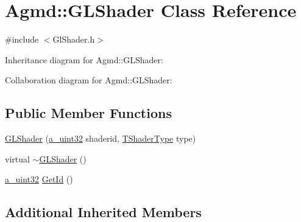 \hypertarget{class_agmd_1_1_g_l_shader}{\section{Agmd\+:\+:G\+L\+Shader Class Reference}
\label{class_agmd_1_1_g_l_shader}
}


{\ttfamily \#include $<$Gl\+Shader.\+h$>$}



Inheritance diagram for Agmd\+:\+:G\+L\+Shader\+:


Collaboration diagram for Agmd\+:\+:G\+L\+Shader\+:
\subsection*{Public Member Functions}
\begin{DoxyCompactItemize}
\item 
\hyperlink{class_agmd_1_1_g_l_shader_a40249832d8d259d55473b76db93048e6}{G\+L\+Shader} (\hyperlink{_common_defines_8h_a964296f9770051b9e4807b1f180dd416}{a\+\_\+uint32} shaderid, \hyperlink{namespace_agmd_a162a493eaff1589f07a505806e6724b4}{T\+Shader\+Type} type)
\item 
virtual \hyperlink{class_agmd_1_1_g_l_shader_afe85fecfaae88181fdc01ada1fb53fb2}{$\sim$\+G\+L\+Shader} ()
\item 
\hyperlink{_common_defines_8h_a964296f9770051b9e4807b1f180dd416}{a\+\_\+uint32} \hyperlink{class_agmd_1_1_g_l_shader_aa0408b15590d96e9a6fd3e9ce45dc6e1}{Get\+Id} ()
\end{DoxyCompactItemize}
\subsection*{Additional Inherited Members}


